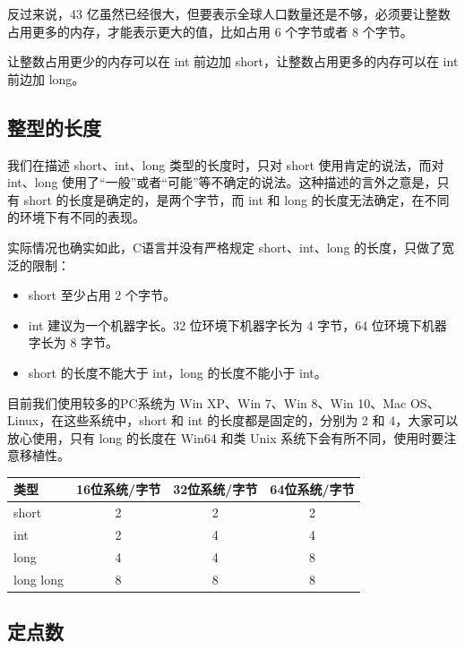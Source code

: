 反过来说，43 亿虽然已经很大，但要表示全球人口数量还是不够，必须要让整数占用更多的内存，才能表示更大的值，比如占用 6 个字节或者 8 个字节。

让整数占用更少的内存可以在 int 前边加 short，让整数占用更多的内存可以在 int 前边加 long。

\subsection{整型的长度}
我们在描述 short、int、long 类型的长度时，只对 short 使用肯定的说法，而对 int、long 使用了“一般”或者“可能”等不确定的说法。这种描述的言外之意是，只有 short 的长度是确定的，是两个字节，而 int 和 long 的长度无法确定，在不同的环境下有不同的表现。

实际情况也确实如此，C语言并没有严格规定 short、int、long 的长度，只做了宽泛的限制：
\begin{itemize}
  \item short 至少占用 2 个字节。
  \item int 建议为一个机器字长。32 位环境下机器字长为 4 字节，64 位环境下机器字长为 8 字节。
  \item short 的长度不能大于 int，long 的长度不能小于 int。
\end{itemize}

目前我们使用较多的PC系统为 Win XP、Win 7、Win 8、Win 10、Mac OS、Linux，在这些系统中，short 和 int 的长度都是固定的，分别为 2 和 4，大家可以放心使用，只有 long 的长度在 Win64 和类 Unix 系统下会有所不同，使用时要注意移植性。

\begin{table}[htpb]
  \centering
  \begin{tabular}{@{}lccc@{}}
  \toprule
  {类型}       & {16位系统/字节} & {32位系统/字节} & {64位系统/字节} \\ \midrule
  {short}     & {2}        & {2}        & {2}        \\
  {int}       & {2}        & {4}        & {4}        \\
  {long}      & {4}        & {4}        & {8}        \\
  {long long} & {8}        & {8}        & {8}        \\ \bottomrule
  \end{tabular}
  \end{table}

\subsection{定点数}

